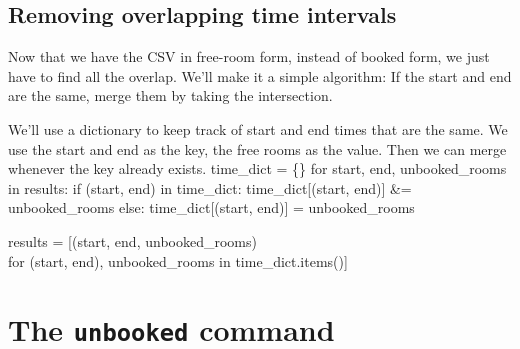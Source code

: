 \subsection{Removing overlapping time intervals}

Now that we have the CSV in free-room form, instead of booked form, we just 
have to find all the overlap.
We'll make it a simple algorithm:
If the start and end are the same, merge them by taking the intersection.

We'll use a dictionary to keep track of start and end times that are the same.
We use the start and end as the key, the free rooms as the value.
Then we can merge whenever the key already exists.
\nwenddocs{}\endmoddef\nwstartdeflinemarkup{}\nwenddeflinemarkup
time_dict = \{\}
for start, end, unbooked_rooms in results:
  if (start, end) in time_dict:
    time_dict[(start, end)] &= unbooked_rooms
  else:
    time_dict[(start, end)] = unbooked_rooms

results = [(start, end, unbooked_rooms) \\
           for (start, end), unbooked_rooms in time_dict.items()]
\nwendcode{}\nwdocspar



\section{The \texttt{unbooked} command}

